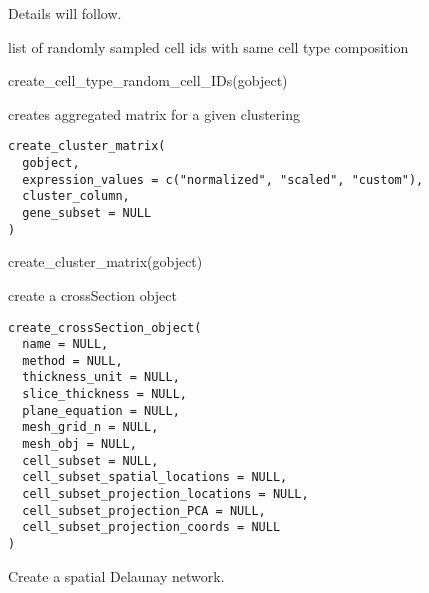\documentclass[a4paper]{book}
\begin{document}
%
\begin{Details}\relax
Details will follow.
\end{Details}
%
\begin{Value}
list of randomly sampled cell ids with same cell type composition
\end{Value}
%
\begin{Examples}
\begin{ExampleCode}
    create_cell_type_random_cell_IDs(gobject)
\end{ExampleCode}
\end{Examples}
%
\begin{Description}\relax
creates aggregated matrix for a given clustering
\end{Description}
%
\begin{Usage}
\begin{verbatim}
create_cluster_matrix(
  gobject,
  expression_values = c("normalized", "scaled", "custom"),
  cluster_column,
  gene_subset = NULL
)
\end{verbatim}
\end{Usage}
%
\begin{Examples}
\begin{ExampleCode}
    create_cluster_matrix(gobject)
\end{ExampleCode}
\end{Examples}
%
\begin{Description}\relax
create a crossSection object
\end{Description}
%
\begin{Usage}
\begin{verbatim}
create_crossSection_object(
  name = NULL,
  method = NULL,
  thickness_unit = NULL,
  slice_thickness = NULL,
  plane_equation = NULL,
  mesh_grid_n = NULL,
  mesh_obj = NULL,
  cell_subset = NULL,
  cell_subset_spatial_locations = NULL,
  cell_subset_projection_locations = NULL,
  cell_subset_projection_PCA = NULL,
  cell_subset_projection_coords = NULL
)
\end{verbatim}
\end{Usage}
%
\begin{Description}\relax
Create a spatial Delaunay network.
\end{Description}
\end{document}
